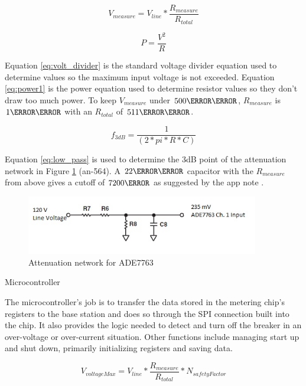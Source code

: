 \begin{equation} %
V_{measure}=V_{line}*\frac{R_{measure}}{R_{total}}
\label{eq:volt_divider}
\end{equation}

\begin{equation} %
P=\frac{V^2}{R}
\label{eq:power1}
\end{equation}

Equation \ref{eq:volt_divider} is the standard voltage divider equation used to determine values so the maximum input voltage is not exceeded. Equation \ref{eq:power1} is the power equation used to determine resistor values so they don't draw too much power. To keep $V_{measure}$ under $500\milli \V$, $R_{measure}$ is $1\kilo\ohm$ with an $R_{total}$ of $511\kilo\ohm$. 

\begin{equation} %
f_{3dB}=\frac{1}{(2*pi*R*C)}
\label{eq:low_pass}
\end{equation}

Equation \ref{eq:low_pass} is used to determine the 3dB point of the attenuation network in Figure \ref{fig:attenuation_network} (an-564). A $22\nano\farad$ capacitor with the $R_{measure}$ from above gives a cutoff of $7200\hertz$ as suggested by the app note \cite{AN564}. 

\begin{figure}[htbp]
\begin{center}
\includegraphics[width=4in]{includes/NJAttenuationNetwork2} 
\caption{Attenuation network for ADE7763 \cite{AN564}}
\label{fig:attenuation_network} 
\end{center}
\end{figure}

Microcontroller

The microcontroller's job is to transfer the data stored in the metering chip's registers to the base station and does so through the SPI connection built into the chip. It also provides the logic needed to detect and turn off the breaker in an over-voltage or over-current situation. Other functions include managing start up and shut down, primarily initializing registers and saving data. 

\begin{equation} %
V_{voltageMax}=V_{line}*\frac{R_{measure}}{R_{total}}*N_{safetyFactor}
\label{eq:volt_divide_safety}
\end{equation}

